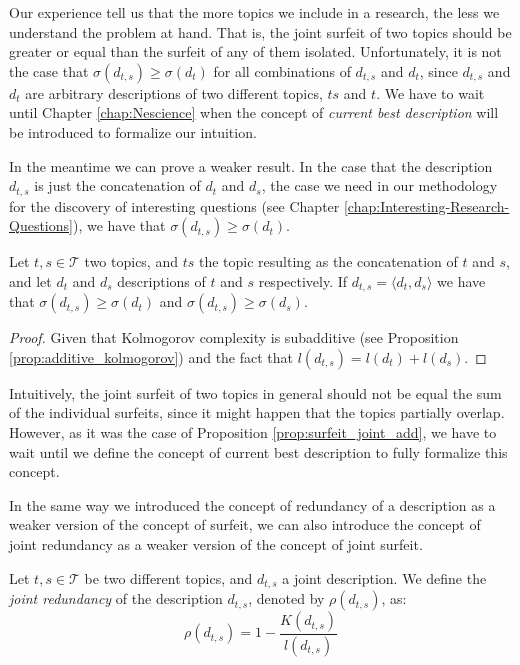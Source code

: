 Our experience tell us that the more topics we include in a research, the less we understand the problem at hand. That is, the joint surfeit of two topics should be greater or equal than the surfeit of any of them isolated. Unfortunately, it is not the case that $\sigma(d_{t,s}) \geq \sigma(d_t)$ for all combinations of $d_{t,s}$ and $d_t$, since $d_{t,s}$ and $d_t$ are arbitrary descriptions of two different topics, $ts$ and $t$. We have to wait until Chapter \ref{chap:Nescience} when the concept of \emph{current best description} will be introduced to formalize our intuition.

In the meantime we can prove a weaker result. In the case that the description $d_{t,s}$ is just the concatenation of $d_t$ and $d_s$, the case we need in our methodology for the discovery of interesting questions (see Chapter \ref{chap:Interesting-Research-Questions}), we have that $\sigma(d_{t,s}) \geq \sigma(d_t)$.

\begin{proposition}
\label{prop:surfeit_joint_add}
Let $t, s \in \mathcal{T}$ two topics, and $ts$ the topic resulting as the concatenation of $t$ and $s$, and let $d_t$ and $d_s$ descriptions of $t$ and $s$ respectively. If $d_{t,s} = \langle d_t, d_s \rangle$ we have that  $\sigma(d_{t,s}) \geq \sigma(d_t)$  and $\sigma(d_{t,s}) \geq \sigma(d_s)$.
\end{proposition}
\begin{proof}
Given that Kolmogorov complexity is subadditive (see Proposition \ref{prop:additive_kolmogorov}) and the fact that $l(d_{t,s}) = l(d_t) + l(d_s)$.
\end{proof}

Intuitively, the joint surfeit of two topics in general should not be equal the sum of the individual surfeits, since it might happen that the topics partially overlap. However, as it was the case of Proposition \ref{prop:surfeit_joint_add}, we have to wait until we define the concept of current best description to fully formalize this concept.

In the same way we introduced the concept of redundancy of a description as a weaker version of the concept of surfeit, we can also introduce the concept of joint redundancy as a weaker version of the concept of joint surfeit.

\begin{definition}
Let $t,s \in \mathcal{T}$ be two different topics, and $d_{t,s}$ a joint description. We define the \emph{joint redundancy} of the description $d_{t,s}$, denoted by $\rho(d_{t,s})$, as: 
\[
\rho(d_{t,s}) = 1 - \frac{K\left( d_{t,s} \right)}{l \left( d_{t,s} \right)}
\]
\end{definition}

